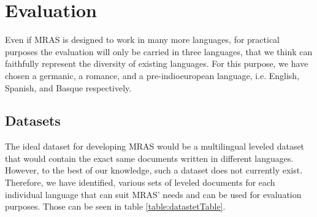 \documentclass[12pt]{article}
\begin{document}

\section{Evaluation}

Even if MRAS is designed to work in many more languages, for practical purposes the evaluation will only be carried in three languages, that we think can faithfully represent the diversity of existing languages. For this purpose, we have chosen a germanic, a romance, and a pre-indioeuropean language, i.e. English, Spanish, and Basque respectively.


\subsection{Datasets}
The ideal dataset for developing MRAS would be a multilingual leveled dataset that would contain the exact same documents written in different languages. However, to the best of our knowledge, such a dataset does not currently exist. Therefore, we have identified, various sets of leveled documents for each individual language that can suit MRAS' needs and can be used for evaluation purposes. Those can be seen in table \ref{table:datastetTable}.
\end{document}
